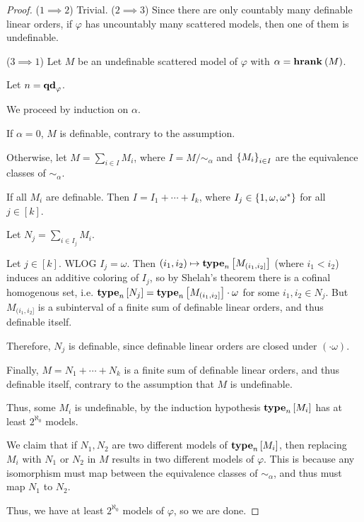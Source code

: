 \begin{proof}
     ($1 \implies 2$) Trivial.
        ($2 \implies 3$) Since there are only countably many
        definable linear orders,
        if $\varphi$ has uncountably many scattered models,
        then one of them is undefinable.

        ($3 \implies 1$)
        Let $M$ be an undefinable scattered model of $\varphi$
        with $\alpha = \mathbf{hrank}_{} \left( {M} \right)$.

        Let $n = \mathbf{qd}_{\varphi}$.

        We proceed by induction on $\alpha$.

        If $\alpha = 0$, $M$ is definable, contrary to the assumption.

        Otherwise, let $M = \sum_{i \in I} M_i$,
        where $I = M / \sim_{\alpha}$ and $\left\{ {M_i} \right\}_{i \in I}$
        are the equivalence classes of $\sim_{\alpha}$.
        
        If all $M_i$ are definable. Then $I = I_1 + \cdots + I_k$,
        where $I_j \in \left\{ {1, \omega, \omega^\ast} \right\}$ for all $j \in [k]$.

        Let $N_j = \sum_{i \in I_j} M_i$.

        Let $j \in [k]$. WLOG $I_j = \omega$.
        Then $(i_1, i_2) \mapsto \mathbf{type}_{n} \left[ {M_{(i_1, i_2]}} \right]$ (where $i_1 < i_2$)
        induces an additive coloring of $I_j$, so by Shelah's theorem
        there is a cofinal homogenous set,
        i.e. $\mathbf{type}_{n} \left[ {N_j} \right] = \mathbf{type}_{n} \left[ {M_{(i_1, i_2]}} \right] \cdot \omega$ for some
        $i_1, i_2 \in N_j$. But $M_{(i_1, i_2]}$ is a subinterval
        of a finite sum of definable linear orders,
        and thus definable itself.

        Therefore, $N_j$ is definable, since
        definable linear orders are closed under $(\cdot \omega)$.

        Finally, $M = N_1 + \cdots + N_k$ is a finite sum of definable linear orders,
        and thus definable itself, contrary to the assumption that $M$ is undefinable.

        Thus, some $M_i$ is undefinable, by the induction
        hypothesis $\mathbf{type}_{n} \left[ {M_i} \right]$ has at least
        $2^{\aleph_0}$ models.

        We claim that if $N_1, N_2$ are two different models of $\mathbf{type}_{n} \left[ {M_i} \right]$,
        then replacing $M_i$ with $N_1$ or $N_2$ in $M$
        results in two different models of $\varphi$.
        This is because any isomorphism must map
        between the equivalence classes of $\sim_{\alpha}$,
        and thus must map $N_1$ to $N_2$.

        Thus, we have at least $2^{\aleph_0}$ models of $\varphi$,
        so we are done.
\end{proof}

